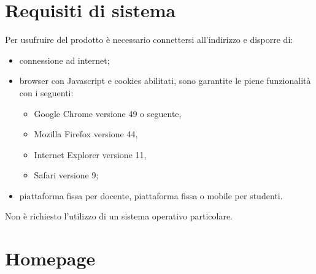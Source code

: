 \documentclass[a4paper, titlepage]{article}
\begin{document}
	\section{Requisiti di sistema}
	Per usufruire del prodotto è necessario connettersi all'indirizzo  e disporre di:
	\begin{itemize}
		\item connessione ad internet;
		\item browser con Javascript e cookies abilitati, sono garantite le piene funzionalità con i seguenti:
		\begin{itemize}
			\item Google Chrome versione 49 o seguente,
			\item Mozilla Firefox versione 44,
			\item Internet Explorer versione 11,
			\item Safari versione 9;
		\end{itemize}
		\item piattaforma fissa per docente, piattaforma fissa o mobile per studenti.
	\end{itemize}
	Non è richiesto l’utilizzo di un sistema operativo particolare.
	
	\section{Homepage}
	
\end{document}
